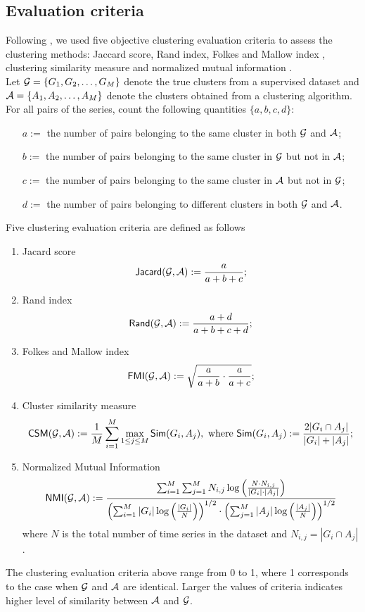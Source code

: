 \documentclass{article} %
\begin{document}
\subsection{Evaluation criteria}
Following \citet{wt_05}, we used five objective clustering evaluation criteria to assess the clustering methods: Jaccard score, Rand index, Folkes and Mallow index \citep{cv_01}, clustering similarity measure \citep{csm_00} and normalized mutual information \citep{nmi_02}.\\
Let ${\cal G}=\{G_1,G_2,\ldots,G_M\}$ denote the true clusters from a supervised dataset and ${\cal A}=\{A_1,A_2,\ldots,A_M\}$ denote the clusters obtained from a clustering algorithm. For all pairs of the series, count the following quantities $\{a,b,c,d\}$:
\begin{itemize}
\item[$a:=$] the number of pairs belonging to the same cluster in both $\cal G$ and $\cal A$;
\item[$b:=$] the number of pairs belonging to the same cluster in $\cal G$ but not in $\cal A$;
\item[$c:=$] the number of pairs belonging to the same cluster in $\cal A$ but not in $\cal G$;
\item[$d:=$] the number of pairs belonging to different clusters in both $\cal G$ and $\cal A$. 
\end{itemize} 
Five clustering evaluation criteria are defined as follows 
\begin{enumerate}
\item Jacard score
\[{\sf Jacard}({\cal G},{\cal A}):=\frac{a}{a+b+c};\]
\item Rand index
\[{\sf Rand}({\cal G},{\cal A}):=\frac{a+d}{a+b+c+d};\]
\item Folkes and Mallow index
\[{\sf FMI}({\cal G},{\cal A}):=\sqrt{\frac{a}{a+b}\cdot\frac{a}{a+c}};\]
\item Cluster similarity measure
\[{\sf CSM}({\cal G},{\cal A}):=\frac{1}{M}\sum_{i=1}^M\max_{1\leq j\leq M}{\sf Sim}(G_i,A_j),~\mbox{where}~{\sf Sim}(G_i,A_j):=\frac{2|G_i\cap A_j|}{|G_i|+|A_j|};\]
\item Normalized Mutual Information
\[{\sf NMI}({\cal G},{\cal A}):=\frac{\sum_{i=1}^M\sum_{j=1}^MN_{i,j}\log\left(\frac{N\cdot N_{i,j}}{|G_i|\cdot|A_j|}\right)}{\left(\sum_{i=1}^M|G_i|\log\left(\frac{|G_i|}{N}\right)\right)^{1/2}\cdot\left(\sum_{j=1}^M|A_j|\log\left(\frac{|A_j|}{N}\right)\right)^{1/2}}\]
where $N$ is the total number of time series in the dataset and $N_{i,j}=|G_i\cap A_j|$.
\end{enumerate}
The clustering evaluation criteria above range from 0 to 1, where 1 corresponds to the case when $\cal G$ and $\cal A$ are identical. Larger the values of criteria indicates higher level of similarity between $\cal A$ and $\cal G$.
\end{document}
